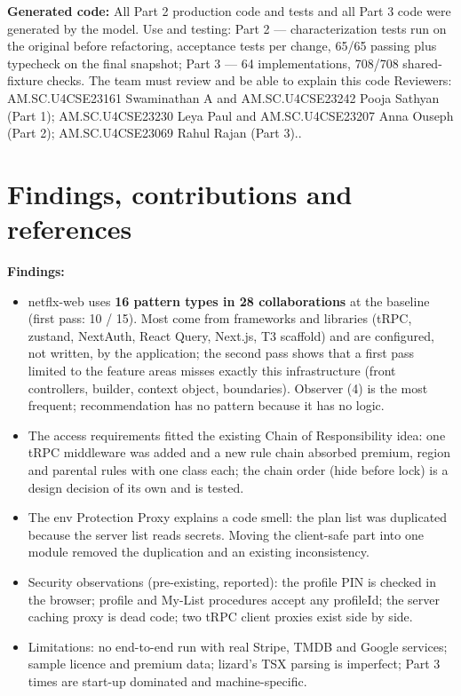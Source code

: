 \documentclass[11pt,a4paper]{article}
\newcommand{\entry}[2]{\textbf{#1:} #2\par}
\begin{document}
\entry{Generated code}{All Part 2 production code and tests and all Part 3 code were generated by the model. Use and testing: Part 2 --- characterization tests run on the original before refactoring, acceptance tests per change, 65/65 passing plus typecheck on the final snapshot; Part 3 --- 64 implementations, 708/708 shared-fixture checks. The team must review and be able to explain this code Reviewers: AM.SC.U4CSE23161 Swaminathan A and AM.SC.U4CSE23242 Pooja Sathyan (Part 1); AM.SC.U4CSE23230 Leya Paul and AM.SC.U4CSE23207 Anna Ouseph (Part 2); AM.SC.U4CSE23069 Rahul Rajan (Part 3)..}

\section{Findings, contributions and references}
\entry{Findings}{\begin{itemize}
\item netflx-web uses \textbf{16 pattern types in 28 collaborations} at the baseline (first pass: 10 / 15). Most come from frameworks and libraries (tRPC, zustand, NextAuth, React Query, Next.js, T3 scaffold) and are configured, not written, by the application; the second pass shows that a first pass limited to the feature areas misses exactly this infrastructure (front controllers, builder, context object, boundaries). Observer (4) is the most frequent; recommendation has no pattern because it has no logic.
\item The access requirements fitted the existing Chain of Responsibility idea: one tRPC middleware was added and a new rule chain absorbed premium, region and parental rules with one class each; the chain order (hide before lock) is a design decision of its own and is tested.
\item The env Protection Proxy explains a code smell: the plan list was duplicated because the server list reads secrets. Moving the client-safe part into one module removed the duplication and an existing inconsistency.
\item Security observations (pre-existing, reported): the profile PIN is checked in the browser; profile and My-List procedures accept any profileId; the server caching proxy is dead code; two tRPC client proxies exist side by side.
\item Limitations: no end-to-end run with real Stripe, TMDB and Google services; sample licence and premium data; lizard's TSX parsing is imperfect; Part 3 times are start-up dominated and machine-specific.
\end{itemize}}
\end{document}
